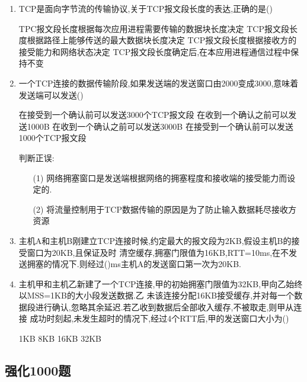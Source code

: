\documentclass[12pt, a4paper, oneside, UTF8]{ctexbook}
\begin{document}
\begin{enumerate}
    \item TCP是面向字节流的传输协议,关于TCP报文段长度的表达,正确的是(\qquad)
    \begin{choices}[1]
        \task TPC报文段长度根据每次应用进程需要传输的数据块长度决定
        \task TCP报文段长度根据路径上能够传送的最大数据块长度决定
        \task TCP报文段长度根据接收方的接受能力和网络状态决定
        \task TCP报文段长度确定后,在本应用进程通信过程中保持不变
    \end{choices}

    \item 一个TCP连接的数据传输阶段,如果发送端的发送窗口由2000变成3000,意味着发送端可以发送(\qquad)
    \begin{choices}[1]
        \task 在接受到一个确认前可以发送3000个TCP报文段
        \task 在收到一个确认之前可以发送1000B
        \task 在收到一个确认之前可以发送3000B
        \task 在接受到一个确认前可以发送1000个TCP报文段
    \end{choices}

    判断正误:
    \begin{enumerate}
        \item [(1)] 网络拥塞窗口是发送端根据网络的拥塞程度和接收端的接受能力而设定的. 
        \item [(2)] 将流量控制用于TCP数据传输的原因是为了防止输入数据耗尽接收方资源
    \end{enumerate}

    \item 主机A和主机B刚建立TCP连接时候,约定最大的报文段为2KB,假设主机B的接受窗口为20KB,且保证及时
    清空缓存,拥塞门限值为16KB,RTT=10ms,在不发送拥塞的情况下.则经过(\qquad)ms主机A的发送窗口第一次为20KB.

    \item 主机甲和主机乙新建了一个TCP连接,甲的初始拥塞门限值为32KB,甲向乙始终以MSS=1KB的大小段发送数据.乙
    未该连接分配16KB接受缓存,并对每一个数据段进行确认,忽略其余延迟.若乙收到数据后全部收入缓存,不被取走,则甲从连接
    成功时刻起,未发生超时的情况下,经过4个RTT后,甲的发送窗口大小为(\qquad)
    \begin{choices}
        \task 1KB
        \task 8KB
        \task 16KB
        \task 32KB
    \end{choices}
\end{enumerate}

\subsection{强化1000题}
\end{document}
